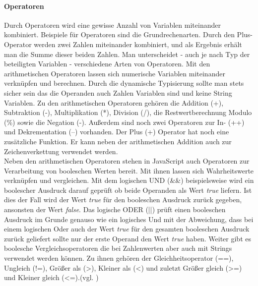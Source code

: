 \documentclass[12pt,a4paper,bibliography=totocnumbered,listof=totocnumbered]{scrartcl}
\begin{document}
\paragraph{Operatoren} \glqq Durch Operatoren wird eine gewisse Anzahl von Variablen miteinander kombiniert. Beispiele für Operatoren sind die Grundrechenarten. Durch den Plus-Operator werden zwei Zahlen miteinander kombiniert, und als Ergebnis erhält man die Summe dieser beiden Zahlen. Man unterscheidet - auch je nach Typ der beteiligten Variablen - verschiedene Arten von Operatoren.\grqq{}\cite[S.69]{WenzJava2008} Mit den arithmetischen Operatoren lassen sich numerische Variablen miteinander verknüpfen und berechnen. Durch die dynamische Typisierung sollte man stets sicher sein das die Operanden auch Zahlen Variablen sind und keine String Variablen. Zu den arithmetischen Operatoren gehören die Addition (+), Subtraktion (-), Multiplikation (*), Division (/), die Restwertberechnung Modulo (\%) sowie die Negation (-). Außerdem sind noch zwei Operatoren zur In- (++) und Dekrementation (--) vorhanden. Der Plus (+) Operator hat noch eine zusätzliche Funktion. Er kann neben der arithmetischen Addition auch zur Zeichenverkettung verwendet werden.\\Neben den arithmetischen Operatoren stehen in JavaScript auch Operatoren zur Verarbeitung von booleschen Werten bereit. Mit ihnen lassen sich Wahrheitswerte verknüpfen und vergleichen. Mit dem logischen UND (\&\&) beispielsweise wird ein boolescher Ausdruck darauf geprüft ob beide Operanden als Wert \textit{true} liefern. Ist dies der Fall wird der Wert \textit{true} für den booleschen Ausdruck zurück gegeben, ansonsten der Wert \textit{false}. Das logische ODER (||) prüft einen booleschen Ausdruck im Grunde genauso wie ein logisches Und mit der Abweichung, dass bei einem logischen Oder auch der Wert \textit{true} für den gesamten booleschen Ausdruck zurück geliefert sollte nur der erste Operand den Wert \textit{true} haben. Weiter gibt es boolesche Vergleichsoperatoren die bei Zahlenwerten aber auch mit Strings verwendet werden können. Zu ihnen gehören der Gleichheitsoperator (==), Ungleich (!=), Größer als (\textgreater), Kleiner als (\textless) und zuletzt Größer gleich (\textgreater=) und Kleiner gleich (\textless=).(vgl. \cite[S.71ff]{WenzJava2008})
\end{document}
